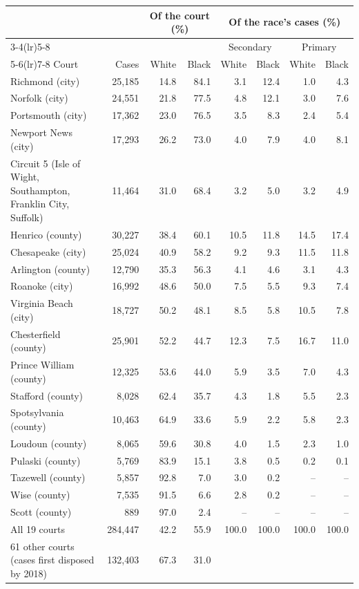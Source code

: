 \begin{tabular}{lrrrrrrr}
\toprule
 & & \multicolumn{2}{c}{Of the court (\%)} & \multicolumn{4}{c}{Of the race's cases (\%)} \\
\cmidrule(lr){3-4}\cmidrule(lr){5-8}
 & & & & \multicolumn{2}{c}{Secondary} & \multicolumn{2}{c}{Primary} \\
\cmidrule(lr){5-6}\cmidrule(lr){7-8}
Court & Cases & White & Black & White & Black & White & Black \\
\midrule
Richmond (city) & 25,185 & 14.8 & 84.1 & 3.1 & 12.4 & 1.0 & 4.3 \\
Norfolk (city) & 24,551 & 21.8 & 77.5 & 4.8 & 12.1 & 3.0 & 7.6 \\
Portsmouth (city) & 17,362 & 23.0 & 76.5 & 3.5 & 8.3 & 2.4 & 5.4 \\
Newport News (city) & 17,293 & 26.2 & 73.0 & 4.0 & 7.9 & 4.0 & 8.1 \\
Circuit 5 (Isle of Wight, Southampton, Franklin City, Suffolk) & 11,464 & 31.0 & 68.4 & 3.2 & 5.0 & 3.2 & 4.9 \\
Henrico (county) & 30,227 & 38.4 & 60.1 & 10.5 & 11.8 & 14.5 & 17.4 \\
Chesapeake (city) & 25,024 & 40.9 & 58.2 & 9.2 & 9.3 & 11.5 & 11.8 \\
Arlington (county) & 12,790 & 35.3 & 56.3 & 4.1 & 4.6 & 3.1 & 4.3 \\
Roanoke (city) & 16,992 & 48.6 & 50.0 & 7.5 & 5.5 & 9.3 & 7.4 \\
Virginia Beach (city) & 18,727 & 50.2 & 48.1 & 8.5 & 5.8 & 10.5 & 7.8 \\
Chesterfield (county) & 25,901 & 52.2 & 44.7 & 12.3 & 7.5 & 16.7 & 11.0 \\
Prince William (county) & 12,325 & 53.6 & 44.0 & 5.9 & 3.5 & 7.0 & 4.3 \\
Stafford (county) & 8,028 & 62.4 & 35.7 & 4.3 & 1.8 & 5.5 & 2.3 \\
Spotsylvania (county) & 10,463 & 64.9 & 33.6 & 5.9 & 2.2 & 5.8 & 2.3 \\
Loudoun (county) & 8,065 & 59.6 & 30.8 & 4.0 & 1.5 & 2.3 & 1.0 \\
Pulaski (county) & 5,769 & 83.9 & 15.1 & 3.8 & 0.5 & 0.2 & 0.1 \\
Tazewell (county) & 5,857 & 92.8 & 7.0 & 3.0 & 0.2 & -- & -- \\
Wise (county) & 7,535 & 91.5 & 6.6 & 2.8 & 0.2 & -- & -- \\
Scott (county) & 889 & 97.0 & 2.4 & -- & -- & -- & -- \\
\midrule
All 19 courts & 284,447 & 42.2 & 55.9 & 100.0 & 100.0 & 100.0 & 100.0 \\
61 other courts (cases first disposed by 2018) & 132,403 & 67.3 & 31.0 &  &  &  &  \\
\bottomrule
\end{tabular}
